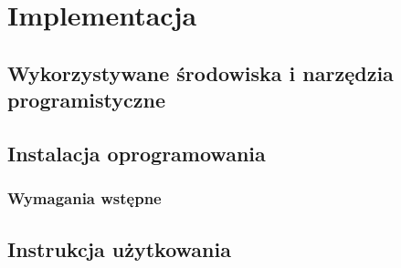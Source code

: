\chapter{Implementacja}
\section{Wykorzystywane środowiska i narzędzia programistyczne}
\section{Instalacja oprogramowania}
\subsection{Wymagania wstępne}
\section{Instrukcja użytkowania}